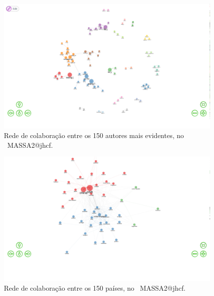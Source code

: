 \begin{figure}
    \centering
    \includegraphics[width=1\textwidth]{exploratory-data-analysis/jhcf/PesqBibliogr/SimulacaoMultiagente/WoS-20220203/Estrutura/Social/MASSA2-Collaboration-Network-150authors.png}
    \caption{Rede de colaboração entre os 150 autores mais evidentes, no  \dataset\ MASSA2@jhcf.}
    \label{fig:MASSA2-Collaboration-Network-150authors}
\end{figure}

\begin{figure}
    \centering
    \includegraphics[width=1\textwidth]{exploratory-data-analysis/jhcf/PesqBibliogr/SimulacaoMultiagente/WoS-20220203/Estrutura/Social/MASSA2-Collaboration-Network-50country.png}
    \caption{Rede de colaboração entre os 150 países, no  \dataset\ MASSA2@jhcf.}
    \label{fig:MASSA2-Collaboration-Network-50country}
\end{figure}


